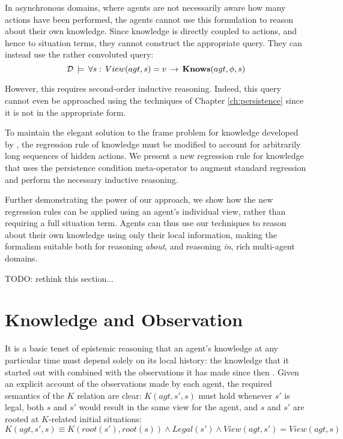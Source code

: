 In asynchronous domains, where agents are not necessarily aware how
many actions have been performed, the agents cannot use this formulation
to reason about their own knowledge. Since knowledge is directly coupled
to actions, and hence to situation terms, they cannot construct the
appropriate query. They can instead use the rather convoluted query:\[
\mathcal{D}\,\models\,\forall s:\, View(agt,s)=v\,\rightarrow\,\mathbf{Knows}(agt,\phi,s)\]


However, this requires second-order inductive reasoning. Indeed, this
query cannot even be approached using the techniques of Chapter \ref{ch:persistence}
since it is not in the appropriate form.

To maintain the elegant solution to the frame problem for knowledge
developed by \citet{scherl03sc_knowledge}, the regression rule of
knowledge must be modified to account for arbitrarily long sequences
of hidden actions. We present a new regression rule for knowledge
that uses the persistence condition meta-operator to augment standard
regression and perform the necessary inductive reasoning.

Further demonstrating the power of our approach, we show how the new
regression rules can be applied using an agent's individual view,
rather than requiring a full situation term. Agents can thus use our
techniques to reason about their own knowledge using only their local
information, making the formalism suitable both for reasoning \emph{about},
and reasoning \emph{in}, rich multi-agent domains.

TODO: rethink this section...


\section{Knowledge and Observation\label{sub:Knowledge-and-Observation}}

It is a basic tenet of epistemic reasoning that an agent's knowledge
at any particular time must depend solely on its local history: the
knowledge that it started out with combined with the observations
it has made since then \citep{halpern90knowledge_distrib}. Given
an explicit account of the observations made by each agent, the required
semantics of the $K$ relation are clear: $K(agt,s',s)$ must hold
whenever $s'$ is legal, both $s$ and $s'$ would result in the same
view for the agent, and $s$ and $s'$ are rooted at $K$-related
initial situations:\begin{equation}
K(agt,s',s)\equiv K(root(s'),root(s))\wedge Legal(s')\wedge View(agt,s')=View(agt,s)\label{eq:k-desired}\end{equation}


